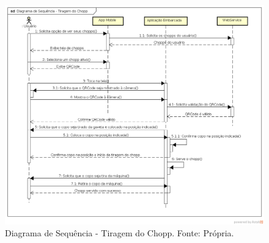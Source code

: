 \begin{figure}[!htb]
    \centering
    \includegraphics[scale= 0.4]{figuras/Diagrama-de-Sequencia-Tiragem-do-Chopp.png}        
    \caption{Diagrama de Sequência - Tiragem do Chopp. Fonte: Própria.}
    \label{classes-kivy}
\end{figure}

